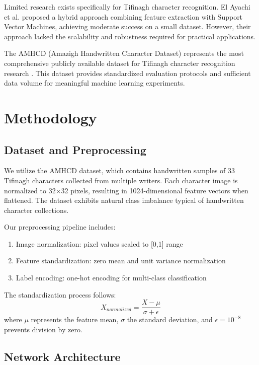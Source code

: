 \documentclass[12pt,a4paper]{article}
\begin{document}
	Limited research exists specifically for Tifinagh character recognition. El Ayachi et al. \cite{tifinagh_recognition} proposed a hybrid approach combining feature extraction with Support Vector Machines, achieving moderate success on a small dataset. However, their approach lacked the scalability and robustness required for practical applications.
	
	The AMHCD (Amazigh Handwritten Character Dataset) represents the most comprehensive publicly available dataset for Tifinagh character recognition research \cite{amhcd_dataset}. This dataset provides standardized evaluation protocols and sufficient data volume for meaningful machine learning experiments.
	
	\section{Methodology}
	
	\subsection{Dataset and Preprocessing}
	
	We utilize the AMHCD dataset, which contains handwritten samples of 33 Tifinagh characters collected from multiple writers. Each character image is normalized to 32×32 pixels, resulting in 1024-dimensional feature vectors when flattened. The dataset exhibits natural class imbalance typical of handwritten character collections.
	
	Our preprocessing pipeline includes:
	\begin{enumerate}
		\item Image normalization: pixel values scaled to [0,1] range
		\item Feature standardization: zero mean and unit variance normalization
		\item Label encoding: one-hot encoding for multi-class classification
	\end{enumerate}
	
	The standardization process follows:
	\begin{equation}
		X_{normalized} = \frac{X - \mu}{\sigma + \epsilon}
	\end{equation}
	where $\mu$ represents the feature mean, $\sigma$ the standard deviation, and $\epsilon = 10^{-8}$ prevents division by zero.
	
	\subsection{Network Architecture}
	
\end{document}
